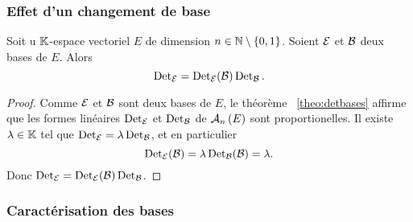 \subsubsection{Effet d'un changement de base}

\begin{prop}
  Soit u \(\K\)-espace vectoriel \(E\) de dimension \(n \in \N\setminus\{0,1\}\). Soient \(\E\) et \(\B\) deux bases de \(E\). Alors
  \begin{equation}
    \Det_\E = \Det_\E(\B) \Det_\B.
  \end{equation}
\end{prop}
\begin{proof}
  Comme \(\E\) et \(\B\) sont deux bases de \(E\), le théorème~
\ref{theo:detbases} affirme que les formes linéaires \(\Det_\E\) et \(\Det_\B\) de \(\AN{n}{E}\) sont proportionelles. Il existe \(\lambda \in \K\) tel que \(\Det_\E = \lambda \Det_\B\), et en particulier
  \begin{equation}
    \Det_\E(\B)= \lambda \Det_\B(\B) = \lambda.
  \end{equation}
  Donc \(\Det_\E = \Det_\E(\B) \Det_\B\).
\end{proof}

\subsubsection{Caractérisation des bases}

